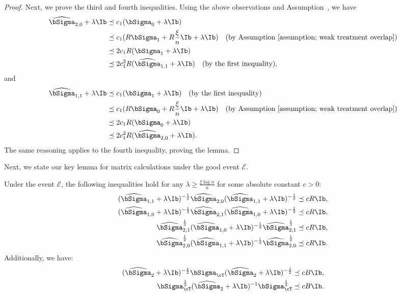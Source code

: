 \documentclass[12pt,a4paper,pdftex,onepage]{article}
\newcommand{\Sighat}{\widehat{{\bSigma}}}
\newcommand{\Sigmatreated}{\bSigma_{1}}
\newcommand{\Sigmacontrol}{\bSigma_{0}}
\newcommand{\event}{\mathscr{E}}
\begin{document}
\begin{proof}
Next, we prove the third and fourth inequalities. Using the above observations and Assumption~, we have
\begin{align*}
\Sighat_{2,0} + \lambda \Ib &\preceq c_1 (\Sigmacontrol + \lambda \Ib) \\
&\preceq c_1 (R\Sigmatreated + R\frac{\xi}{n} \Ib + \lambda \Ib) \quad \text{(by Assumption~\ref{assumption; weak treatment overlap})}\\
&\preceq 2c_1 R (\Sigmatreated + \lambda \Ib)  \\
&\preceq 2c_1^2 R (\Sighat_{1,1} + \lambda \Ib) \quad (\text{by the first inequality}),
\end{align*}
and
\begin{align*}
\Sighat_{1,1} + \lambda \Ib &\preceq c_1 (\Sigmatreated + \lambda \Ib) \quad (\text{by the first inequality}) \\
&\preceq c_1 (R\Sigmacontrol + R\frac{\xi}{n} \Ib + \lambda \Ib) \quad \text{(by Assumption~\ref{assumption; weak treatment overlap})} \\
&\preceq 2c_1 R (\Sigmacontrol + \lambda \Ib) \\
&\preceq 2c_1^2 R (\Sighat_{2,0} + \lambda \Ib).
\end{align*}
The same reasoning applies to the fourth inequality, proving the lemma.
\end{proof}

Next, we state our key lemma for matrix calculations under the good event \(\event\).

\begin{corollary}\label{corollary; application of Lemma second moment ratio}
Under the event $\event$, the following inequalities hold for any $\lambda \geq \frac{\xi \log n}{n}$ for some absolute constant \(c>0\):
\begin{align*}
(\Sighat_{1,1} + \lambda \Ib)^{-\frac{1}{2}} \Sighat_{2,0} (\Sighat_{1,1} + \lambda \Ib)^{-\frac{1}{2}} &\preceq c R \Ib, \\
(\Sighat_{1,0} + \lambda \Ib)^{-\frac{1}{2}} \Sighat_{2,1} (\Sighat_{1,0} + \lambda \Ib)^{-\frac{1}{2}} &\preceq c R \Ib, \\
\Sighat_{2,1}^{\frac{1}{2}} (\Sighat_{1,0} + \lambda \Ib)^{-\frac{1}{2}} \Sighat_{2,1}^{\frac{1}{2}} &\preceq c R \Ib, \\
\Sighat_{2,0}^{\frac{1}{2}} (\Sighat_{1,1} + \lambda \Ib)^{-\frac{1}{2}} \Sighat_{2,0}^{\frac{1}{2}} &\preceq c R \Ib.
\end{align*}
Additionally, we have:
\begin{align*}
(\widehat{\bSigma}_{2} + \lambda \Ib)^{-\frac{1}{2}} \bSigma_\cT (\widehat{\bSigma}_{2} + \lambda \Ib)^{-\frac{1}{2}} &\preceq c B \Ib, \\
\bSigma_\cT^{\frac{1}{2}} (\widehat{\bSigma}_{2} + \lambda \Ib)^{-1} \bSigma_\cT^{\frac{1}{2}} &\preceq c B \Ib.
\end{align*}
\end{corollary}
\end{document}
